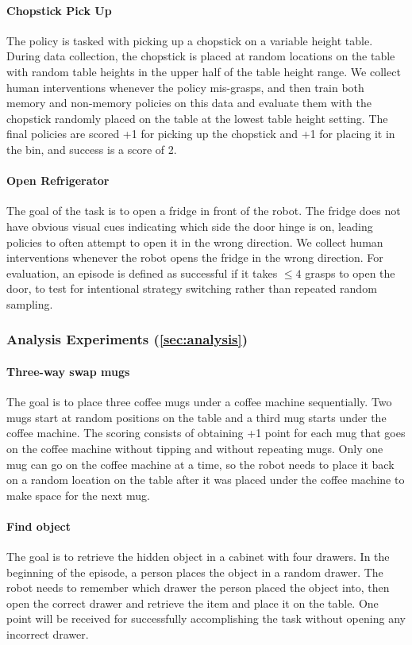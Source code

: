 \paragraph{Chopstick Pick Up} The policy is tasked with picking up a chopstick on a variable height table. During data collection, the chopstick is placed at random locations on the table with random table heights in the upper half of the table height range. We collect human interventions whenever the policy mis-grasps, and then train both memory and non-memory policies on this data and evaluate them with the chopstick randomly placed on the table at the lowest table height setting. The final policies are scored +1 for picking up the chopstick and +1 for placing it in the bin, and success is a score of 2.

\paragraph{Open Refrigerator} The goal of the task is to open a fridge in front of the robot. The fridge does not have obvious visual cues indicating which side the door hinge is on, leading policies to often attempt to open it in the wrong direction. We collect human interventions whenever the robot opens the fridge in the wrong direction. For evaluation, an episode is defined as successful if it takes $\leq 4$ grasps to open the door, to test for intentional strategy switching rather than repeated random sampling.

\vspace{0.3cm}
\subsubsection{Analysis Experiments (\cref{sec:analysis})}
\paragraph{Three-way swap mugs} The goal is to place three coffee mugs under a coffee machine sequentially. Two mugs start at random positions on the table and a third mug starts under the coffee machine. The scoring consists of obtaining +1 point for each mug that goes on the coffee machine without tipping and without repeating mugs. Only one mug can go on the coffee machine at a time, so the robot needs to place it back on a random location on the table after it was placed under the coffee machine to make space for the next mug.

\paragraph{Find object} The goal is to retrieve the hidden object in a cabinet with four drawers. In the beginning of the episode, a person places the object in a random drawer. The robot needs to remember which drawer the person placed the object into, then open the correct drawer and retrieve the item and place it on the table. One point will be received for successfully accomplishing the task without opening any incorrect drawer.


